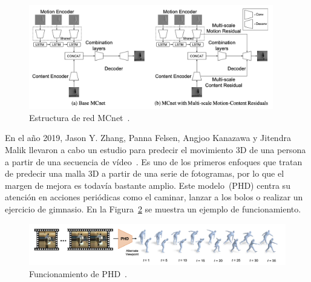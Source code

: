 \vspace{10pt}
\begin{figure}[H]
	\begin{center}
		\includegraphics[width=0.95\textwidth]{ figures/estadoarte/descompose.png}
		\caption{Estructura de red MCnet~\cite{descompose}.
		}
		\label{fig.descompose}
	\end{center}
\end{figure}
\vspace{-10pt}

En el año 2019, Jason Y. Zhang, Panna Felsen, Angjoo Kanazawa y Jitendra Malik llevaron a cabo un estudio para predecir el movimiento 3D de una persona a partir de una secuencia de vídeo~\cite{3d}. Es uno de los primeros enfoques que tratan de predecir una malla 3D a partir de una serie de fotogramas, por lo que el margen de mejora es todavía bastante amplio. Este modelo~(PHD) centra su atención en acciones periódicas como el caminar, lanzar a los bolos o realizar un ejercicio de gimnasio. En la Figura~\ref{fig.3d} se muestra un ejemplo de funcionamiento. 

\vspace{10pt}
\begin{figure}[H]
	\begin{center}
		\includegraphics[width=1\textwidth]{ figures/estadoarte/3D-func.png}
		\caption{Funcionamiento de PHD~\cite{3d}.}
		\label{fig.3d}
	\end{center}
\end{figure}
\vspace{-10pt}

